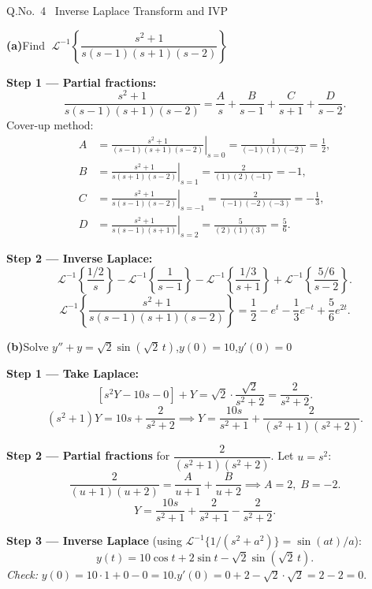 \documentclass[12pt]{article}
\newcommand{\Lt}{\mathcal{L}}
\begin{document}
\vspace{12pt}

\begin{qbox}{Q.No.\ 4 \textemdash\ Inverse Laplace Transform and IVP}
\end{qbox}

\medskip\textbf{(a)}\quad Find $\;\Lt^{-1}\!\left\{\dfrac{s^2+1}{s(s-1)(s+1)(s-2)}\right\}$

\begin{ansbox}
\textbf{Step 1 — Partial fractions:}
\[
  \frac{s^2+1}{s(s-1)(s+1)(s-2)}=\frac{A}{s}+\frac{B}{s-1}+\frac{C}{s+1}+\frac{D}{s-2}.
\]
Cover-up method:
\begin{align*}
  A&=\left.\frac{s^2+1}{(s-1)(s+1)(s-2)}\right|_{s=0}=\frac{1}{(-1)(1)(-2)}=\frac{1}{2},\\
  B&=\left.\frac{s^2+1}{s(s+1)(s-2)}\right|_{s=1}=\frac{2}{(1)(2)(-1)}=-1,\\
  C&=\left.\frac{s^2+1}{s(s-1)(s-2)}\right|_{s=-1}=\frac{2}{(-1)(-2)(-3)}=-\frac{1}{3},\\
  D&=\left.\frac{s^2+1}{s(s-1)(s+1)}\right|_{s=2}=\frac{5}{(2)(1)(3)}=\frac{5}{6}.
\end{align*}

\textbf{Step 2 — Inverse Laplace:}
\[
  \Lt^{-1}\!\left\{\frac{1/2}{s}\right\}-\Lt^{-1}\!\left\{\frac{1}{s-1}\right\}-\Lt^{-1}\!\left\{\frac{1/3}{s+1}\right\}+\Lt^{-1}\!\left\{\frac{5/6}{s-2}\right\}.
\]
\[
  \boxed{\Lt^{-1}\!\left\{\frac{s^2+1}{s(s-1)(s+1)(s-2)}\right\}=\frac{1}{2}-e^t-\frac{1}{3}e^{-t}+\frac{5}{6}e^{2t}.}
\]
\end{ansbox}

\medskip\textbf{(b)}\quad Solve $y''+y=\sqrt{2}\sin(\sqrt{2}\,t)$,\quad $y(0)=10$,\quad $y'(0)=0$

\begin{ansbox}
\textbf{Step 1 — Take Laplace:}
\[
  [s^2Y-10s-0]+Y=\sqrt{2}\cdot\frac{\sqrt{2}}{s^2+2}=\frac{2}{s^2+2}.
\]
\[
  (s^2+1)Y=10s+\frac{2}{s^2+2}\implies Y=\frac{10s}{s^2+1}+\frac{2}{(s^2+1)(s^2+2)}.
\]

\textbf{Step 2 — Partial fractions} for $\dfrac{2}{(s^2+1)(s^2+2)}$. Let $u=s^2$:
\[
  \frac{2}{(u+1)(u+2)}=\frac{A}{u+1}+\frac{B}{u+2}\implies A=2,\;B=-2.
\]
\[
  Y=\frac{10s}{s^2+1}+\frac{2}{s^2+1}-\frac{2}{s^2+2}.
\]

\textbf{Step 3 — Inverse Laplace} (using $\Lt^{-1}\{1/(s^2+a^2)\}=\sin(at)/a$):
\[
  \boxed{y(t)=10\cos t+2\sin t-\sqrt{2}\sin(\sqrt{2}\,t).}
\]
\textit{Check:} $y(0)=10\cdot1+0-0=10$.\;\checkmark\quad $y'(0)=0+2-\sqrt{2}\cdot\sqrt{2}=2-2=0$.\;\checkmark
\end{ansbox}
\end{document}
